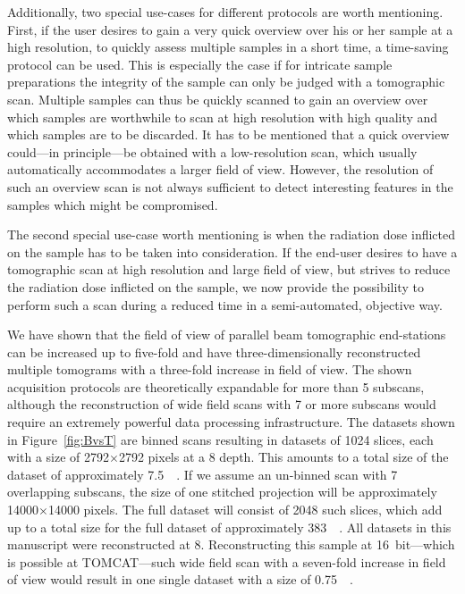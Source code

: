 Additionally, two special use-cases for different protocols are worth mentioning. First, if the user desires to gain a very quick overview over his or her sample at a high resolution, \eg to quickly assess multiple samples in a short time, a time-saving protocol can be used. This is especially the case if for intricate sample preparations the integrity of the sample can only be judged with a tomographic scan. Multiple samples can thus be quickly scanned to gain an overview over which samples are worthwhile to scan at high resolution with high quality and which samples are to be discarded. It has to be mentioned that a quick overview could---in principle---be obtained with a low-resolution scan, which usually automatically accommodates a larger field of view. However, the resolution of such an overview scan is not always sufficient to detect interesting features in the samples which might be compromised.

The second special use-case worth mentioning is when the radiation dose inflicted on the sample has to be taken into consideration. If the end-user desires to have a tomographic scan at high resolution and large field of view, but strives to reduce the radiation dose inflicted on the sample, we now provide the possibility to perform such a scan during a reduced time in a semi-automated, objective way.

We have shown that the field of view of parallel beam tomographic end-stations can be increased up to five-fold and have three-dimensionally reconstructed multiple tomograms with a three-fold increase in field of view. The shown acquisition protocols are theoretically expandable for more than 5 subscans, although the reconstruction of wide field scans with 7 or more subscans would require an extremely powerful data processing infrastructure. The datasets shown in Figure~\ref{fig:BvsT} are binned scans resulting in datasets of 1024 slices, each with a size of 2792$\times$2792 pixels at a \SI{8}{\bit} depth. This amounts to a total size of the dataset of approximately \SI{7.5}{\giga\byte}. If we assume an un-binned scan with 7 overlapping subscans, the size of one stitched projection will be approximately 14000$\times$14000 pixels. The full dataset will consist of 2048 such slices, which add up to a total size for the full dataset of approximately \SI{383}{\giga\byte}. All datasets in this manuscript were reconstructed at \SI{8}{\bit}. Reconstructing this sample at \SI{16}{bit}---which is possible at TOMCAT---such wide field scan with a seven-fold increase in field of view would result in one single dataset with a size of \SI{0.75}{\tera\byte}.

